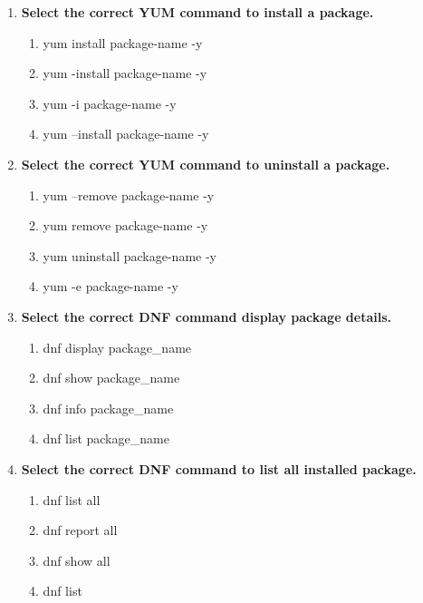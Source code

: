 \begin{flushleft}
\begin{enumerate}
		\item \textbf{Select the correct YUM command to install a package.}
		\begin{enumerate}[label=(\alph*)]
			\item yum install package-name -y %
			\item yum -install package-name -y 
			\item yum -i package-name -y 
			\item yum --install package-name -y 
		\end{enumerate}
		\bigskip
		\bigskip	

		\item \textbf{Select the correct YUM command to uninstall a package.}
		\begin{enumerate}[label=(\alph*)]
			\item yum --remove package-name -y 
			\item yum remove package-name -y %
			\item yum uninstall package-name -y
			\item yum -e package-name -y
		\end{enumerate}
		\bigskip
		\bigskip	
		
		
		\item \textbf{Select the correct DNF command display package details.}
		\begin{enumerate}[label=(\alph*)]
			\item dnf display package\_name
			\item dnf show package\_name
			\item dnf info package\_name   %
			\item dnf list package\_name
		\end{enumerate}
		\bigskip
		\bigskip	

		\item \textbf{Select the correct DNF command to list all installed package.}
		\begin{enumerate}[label=(\alph*)]
			\item dnf list all   %
			\item dnf report all
			\item dnf show all
			\item dnf list
		\end{enumerate}
		\bigskip
		\bigskip	

		
	\end{enumerate}
	
	
\end{flushleft}

